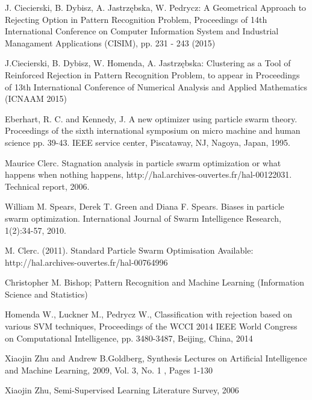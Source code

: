 \documentclass{mini}
\begin{document}
\begin{thebibliography}{1}
    
    J. Ciecierski, B. Dybisz, A. Jastrzębska, W. Pedrycz: A Geometrical Approach to Rejecting Option in Pattern Recognition Problem, Proceedings of 14th International Conference on Computer Information System and Industrial Managament Applications (CISIM), pp. 231 - 243 (2015)
    
    J.Ciecierski, B. Dybisz, W. Homenda, A. Jastrzębska: Clustering as a Tool of Reinforced Rejection in Pattern Recognition Problem, to appear in Proceedings of 13th International Conference of Numerical Analysis and Applied Mathematics (ICNAAM 2015)
    
    Eberhart, R. C. and Kennedy, J. A new optimizer using particle swarm theory. Proceedings of the sixth international symposium on micro machine and human science pp. 39-43. IEEE service center, Piscataway, NJ, Nagoya, Japan, 1995.
    
    Maurice Clerc. Stagnation analysis in particle swarm optimization or what happens when nothing happens, http://hal.archives-ouvertes.fr/hal-00122031. Technical report, 2006.

    William M. Spears, Derek T. Green and Diana F. Spears. Biases in particle swarm optimization. International Journal of Swarm Intelligence Research, 1(2):34-57, 2010.

    M. Clerc. (2011). Standard Particle Swarm Optimisation Available: http://hal.archives-ouvertes.fr/hal-00764996 
    
     Christopher M. Bishop; Pattern Recognition and Machine Learning (Information Science and Statistics)
    
	 Homenda W., Luckner M., Pedrycz W., Classification with rejection based on various SVM techniques, Proceedings of the WCCI 2014 IEEE World Congress on Computational Intelligence, pp. 3480-3487, Beijing, China, 2014     
    
	 Xiaojin Zhu and Andrew B.Goldberg, Synthesis Lectures on Artificial Intelligence and Machine Learning, 2009, Vol. 3, No. 1 , Pages 1-130    
	
     Xiaojin Zhu, Semi-Supervised Learning Literature Survey, 2006


\end{thebibliography}
\end{document}
